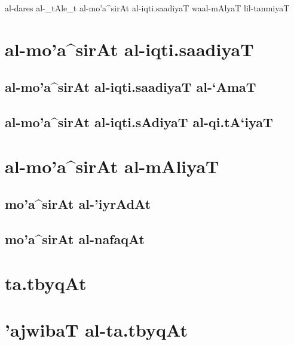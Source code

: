 \documentclass[a4paper]{arabart}
\begin{document}
\novocalize
\setarab

\begin{RLtext}

\begin{center}
\huge{al-dares al-_tAle_t}
\vspace{5pt}
\huge{al-mo'a^sirAt al-iqti.saadiyaT waal-mAlyaT lil-tanmiyaT}
\end{center} 
\vspace{10pt}
\tableofcontents

\end{RLtext}

\thispagestyle{empty}
\newpage

\setcounter{page}{1}

\begin{RLtext}

\smallskip

\section{al-mo'a^sirAt al-iqti.saadiyaT}
\subsection{al-mo'a^sirAt al-iqti.saadiyaT al-`AmaT}
\smallskip


\subsection{al-mo'a^sirAt al-iqti.sAdiyaT al-qi.tA`iyaT}
\smallskip


\section{al-mo'a^sirAt al-mAliyaT}


\subsection{mo'a^sirAt al-'iyrAdAt}


\subsection{mo'a^sirAt al-nafaqAt}


\section{ta.tbyqAt}


\section{'ajwibaT al-ta.tbyqAt}


\end{RLtext}
\end{document}

